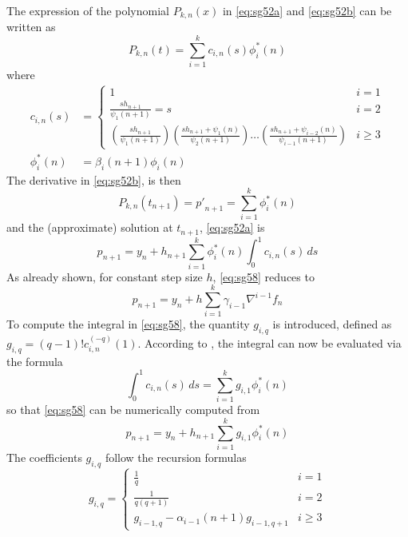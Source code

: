 The expression of the polynomial $P_{k,n}(x)$ in \autoref{eq:sg52a} and \autoref{eq:sg52b} 
can be written as
\begin{equation}\label{eq:sq57}
  P_{k,n}(t) = \sum_{i=1}^{k} c_{i,n} (s) \phi ^{*}_{i}(n)
\end{equation}
where
\begin{align}
  c_{i,n}(s) &= \begin{cases}
    1                                    & i=1 \\
    \frac{s h_{n+1}}{\psi _1 (n+1)} = s  & i=2 \\
    \left(\frac{sh_{n+1}}{\psi _1(n+1)}\right)
    \left(\frac{sh_{n+1} + \psi _1(n)}{\psi _2(n+1)}\right)
    \dots
    \left(\frac{sh_{n+1} + \psi _{i-2}(n)}{\psi _{i-1}(n+1)}\right) & i \ge 3
  \end{cases}
  \label{eq:sg56} \\
  \phi ^{*}_{i}(n) &= \beta _i (n+1) \phi _i (n) \label{eq:sg56b}
\end{align}
The derivative in \autoref{eq:sg52b}, is then
\begin{equation}\label{eq:sg57b}
   P_{k,n}(t_{n+1}) = {p'}_{n+1} = \sum_{i=1}^{k} \phi ^{*}_{i}(n)
\end{equation}
and the (approximate) solution at $t_{n+1}$, \autoref{eq:sg52a} is
\begin{equation}\label{eq:sg58}
  p_{n+1} = y_n + h_{n+1} \sum_{i=1}^{k} \phi ^{*}_{i}(n) \int_{0}^{1} c_{i,n}(s) \,ds
\end{equation}
As already shown, for constant step size $h$, \autoref{eq:sg58} reduces to
\begin{equation}\label{eq:sg58b}
  p_{n+1} = y_n + h \sum_{i=1}^{k} \gamma _{i-1} \nabla ^{i-1} f_n 
\end{equation}
To compute the integral in \autoref{eq:sg58}, the quantity $g_{i,q}$ is 
introduced, defined as $g_{i,q} = (q-1)! c_{i,n}^{(-q)}(1)$. According to 
\cite{Shampine1975}, the integral can now be evaluated via the formula
\begin{equation}
    \int_{0}^{1} c_{i,n}(s) \,ds = \sum_{i=1}^{k} g_{i,1} \phi ^{*}_{i}(n)
\end{equation}
so that \autoref{eq:sg58} can be numerically computed from
\begin{equation}\label{eq:sg511}
  p_{n+1} = y_n + h_{n+1}  \sum_{i=1}^{k} g_{i,1} \phi ^{*}_{i}(n)
\end{equation}
The coefficients $g_{i,q}$ follow the recursion formulas
\begin{equation}\label{eq:sg510}
  g_{i,q} = \begin{cases}
    \frac{1}{q} & i=1 \\
    \frac{1}{q(q+1)} & i=2 \\
    g_{i-1,q} - \alpha _{i-1}(n+1) g_{i-1,q+1} & i \ge 3
  \end{cases}
\end{equation}

